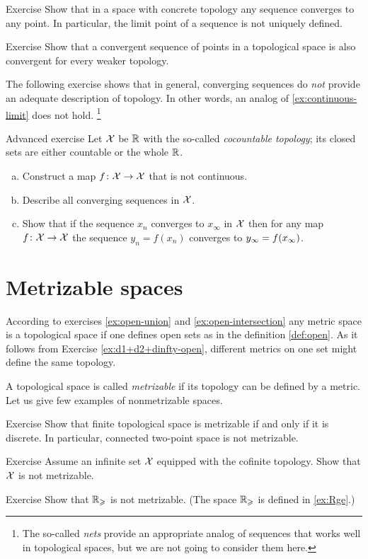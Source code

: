 \begin{thm}{Exercise}
Show that in a space with concrete topology any sequence converges to any point.
In particular, the limit point of a sequence is not uniquely defined.
\end{thm}

\begin{thm}{Exercise}
Show that a convergent sequence of points in a topological space is also convergent for every weaker topology.
\end{thm}

The following exercise shows that in general, converging sequences do \emph{not} provide an adequate description of topology.
In other words, an analog of \ref{ex:continuous-limit} does not hold.%
\footnote{The so-called \emph{nets} provide an appropriate analog of sequences that works well in topological spaces, but we are not going to consider them here.}

\begin{thm}{Advanced exercise}
Let $\mathcal{X}$ be $\mathbb{R}$ with the so-called \emph{cocountable topology};
its closed sets are either countable or the whole $\mathbb{R}$.
\begin{enumerate}[(a)]
\item Construct a map $f\colon\mathcal{X}\to \mathcal{X}$ that is not continuous.
\item Describe all converging sequences in $\mathcal{X}$.
\item Show that if the sequence $x_n$ converges to $x_\infty$ in $\mathcal{X}$ then for any map $f\colon\mathcal{X}\to \mathcal{X}$ the sequence $y_n=f(x_n)$ converges to $y_\infty\z=f(x_\infty)$.
\end{enumerate}

\end{thm}

\section{Metrizable spaces}

According to exercises \ref{ex:open-union} and \ref{ex:open-intersection} any metric space is a topological space if one defines open sets as in the definition \ref{def:open}.
As it follows from Exercise \ref{ex:d1+d2+dinfty-open},
different metrics on one set might define the same topology.

A topological space is called \emph{metrizable} if its topology can be defined by a metric.
Let us give few examples of nonmetrizable spaces.

\begin{thm}{Exercise}\label{ex:finite+metrizable}
Show that finite topological space is metrizable if and only if it is discrete.
In particular, connected two-point space is not metrizable.
\end{thm}

\begin{thm}{Exercise}
Assume an infinite set $\mathcal{X}$ equipped with the cofinite topology.
Show that $\mathcal{X}$ is not metrizable.
\end{thm}

\begin{thm}{Exercise}
Show that $\mathbb{R}_\geqslant$ is not metrizable.
(The space $\mathbb{R}_\geqslant$ is defined in \ref{ex:Rge}.)
\end{thm}

